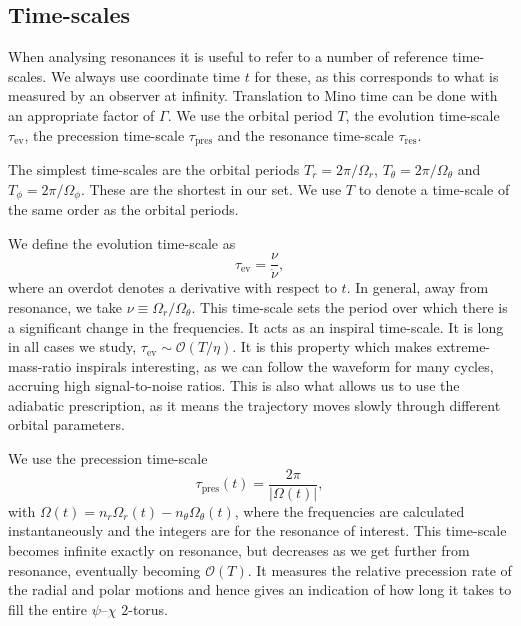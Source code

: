 \documentclass[aps,prd,amsfonts,amssymb,amsmath,nofootinbib,showpacs,superscriptaddress,twocolumn]{revtex4}
\newcommand{\sub}[1]{\ensuremath{_\text{#1}}}
\newcommand{\order}[1]{\ensuremath{\mathcal{O}({#1})}}
\begin{document}
\subsection{Time-scales}\label{sec:res-time}

When analysing resonances it is useful to refer to a number of reference time-scales.  We always use coordinate time $t$ for these, as this corresponds to what is measured by an observer at infinity. Translation to Mino time can be done with an appropriate factor of $\Gamma$. We use the orbital period $T$, the evolution time-scale $\tau\sub{ev}$, the precession time-scale $\tau\sub{pres}$ and the resonance time-scale $\tau\sub{res}$.

The simplest time-scales are the orbital periods $T_r = 2\pi/\Omega_r$, $T_\theta = 2\pi/\Omega_\theta$ and $T_\phi = 2\pi/\Omega_\phi$. These are the shortest in our set. We use $T$ to denote a time-scale of the same order as the orbital periods.

We define the evolution time-scale as
\begin{equation}
\tau\sub{ev} = \frac{\nu}{\dot{\nu}},
\end{equation}
where an overdot denotes a derivative with respect to $t$. In general, away from resonance, we take $\nu \equiv \Omega_r/\Omega_\theta$. This time-scale sets the period over which there is a significant change in the frequencies. It acts as an inspiral time-scale. It is long in all cases we study, $\tau\sub{ev} \sim \order{T/\eta}$. It is this property which makes extreme-mass-ratio inspirals interesting, as we can follow the waveform for many cycles, accruing high signal-to-noise ratios. This is also what allows us to use the adiabatic prescription, as it means the trajectory moves slowly through different orbital parameters.

We use the precession time-scale
\begin{equation}
\tau\sub{pres}(t) = \frac{2\pi}{|\Omega(t)|},
\label{eq:t-pres}
\end{equation}
with $\Omega(t) = n_r \Omega_r(t) - n_\theta \Omega_\theta(t)$, where the frequencies are calculated instantaneously and the integers are for the resonance of interest. This time-scale becomes infinite exactly on resonance, but decreases as we get further from resonance, eventually becoming $\order{T}$. It measures the relative precession rate of the radial and polar motions and hence gives an indication of how long it takes to fill the entire $\psi$--$\chi$ $2$-torus.
\end{document}

